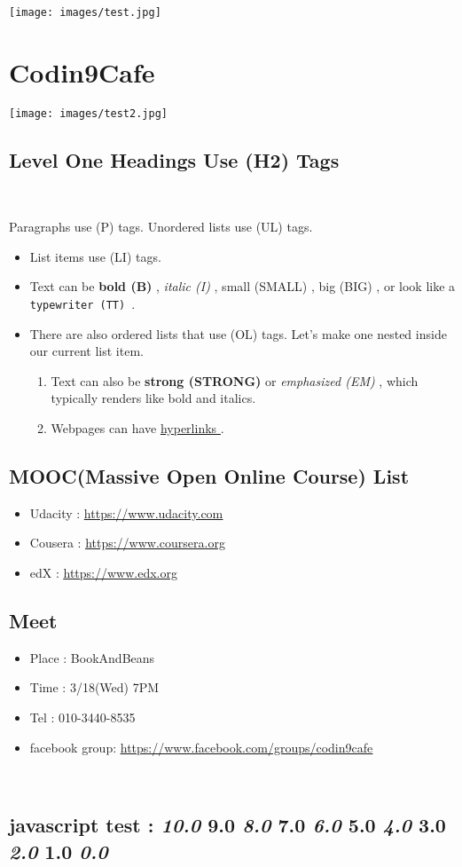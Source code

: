 \documentclass{article}
\begin{document}
\texttt{[image: images/test.jpg]}\section*{Codin9Cafe }\texttt{[image: images/test2.jpg]}\subsection*{Level One Headings Use (H2) Tags }
~

\noindent Paragraphs use (P) tags. Unordered lists use (UL) tags. \begin{itemize}\item{List items use (LI) tags. }\item{Text can be \textbf{bold (B) }, \emph{italic (I) }, {\footnotesize small (SMALL) }, {\Large big (BIG) }, or look like a {\tt typewriter (TT) }. }\item{There are also ordered lists that use (OL) tags. Let's make one nested inside our current list item. \begin{enumerate}\item{Text can also be \textbf{strong (STRONG) }or \emph{emphasized (EM) }, which typically renders like bold and italics. }\item{Webpages can have \href{http://www.google.com}{\underline{hyperlinks }}. }\end{enumerate}}\end{itemize}
\subsection*{MOOC(Massive Open Online Course) List }\begin{itemize}\item{Udacity : \href{https://www.udacity.com}{\underline{https://www.udacity.com }}}\item{Cousera : \href{https://www.coursera.org}{\underline{https://www.coursera.org }}}\item{edX : \href{https://www.edx.org}{\underline{https://www.edx.org }}}\end{itemize}\subsection*{Meet }\begin{itemize}\item{Place : BookAndBeans }\item{Time : 3/18(Wed) 7PM }\item{Tel : 010-3440-8535 }\item{facebook group: \href{https://www.facebook.com/groups/codin9cafe}{\underline{https://www.facebook.com/groups/codin9cafe }}}\end{itemize}
~

\noindent 
\subsection*{javascript test : \emph{10.0 }{\Large 9.0 }\emph{8.0 }{\Large 7.0 }\emph{6.0 }{\Large 5.0 }\emph{4.0 }{\Large 3.0 }\emph{2.0 }{\Large 1.0 }\emph{0.0 }}
\end{document}
